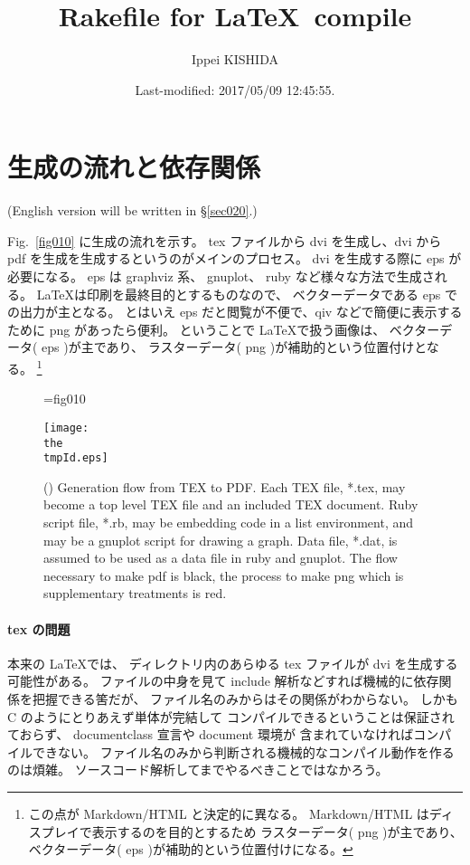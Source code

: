 \documentclass[a4paper,12pt]{jsarticle}
\title{Rakefile for \LaTeX ~compile}
\author{Ippei KISHIDA}
\date{Last-modified: 2017/05/09 12:45:55.}
\begin{document}
\maketitle
\tableofcontents


\section{生成の流れと依存関係}
\label{sec010}

(English version will be written in \S\ref{sec020}.)

Fig.~\ref{fig010} に生成の流れを示す。
tex ファイルから dvi を生成し、dvi から pdf を生成を生成するというのがメインのプロセス。
dvi を生成する際に eps が必要になる。
eps は graphviz 系、 gnuplot、 ruby など様々な方法で生成される。
\LaTeX は印刷を最終目的とするものなので、
ベクターデータである eps での出力が主となる。
とはいえ eps だと閲覧が不便で、qiv などで簡便に表示するために png があったら便利。
ということで \LaTeX で扱う画像は、
ベクターデータ( eps )が主であり、
ラスターデータ( png )が補助的という位置付けとなる。
\footnote{
  この点が Markdown/HTML と決定的に異なる。
  Markdown/HTML はディスプレイで表示するのを目的とするため
  ラスターデータ( png )が主であり、
  ベクターデータ( eps )が補助的という位置付けになる。
}

\begin{figure}[!htbp]
  \tmpId={fig010}
  \begin{center}
    \texttt{[image: \\the\\tmpId.eps]} %
  \end{center}
  \caption{(\the\tmpId)
    \label{\the\tmpId}
    Generation flow from TEX to PDF.
    Each TEX file, *.tex, may become a top level TEX file and an included TEX document.
    Ruby script file, *.rb,
    may be embedding code in a list environment,
    and may be a gnuplot script for drawing a graph.
    Data file, *.dat, is assumed to be used as a data file in ruby and gnuplot.
    The flow necessary to make pdf is black, the process to make png which is supplementary treatments is red.
  }
\end{figure}

\paragraph{tex の問題}

本来の \LaTeX では、
ディレクトリ内のあらゆる tex ファイルが dvi を生成する可能性がある。
ファイルの中身を見て include 解析などすれば機械的に依存関係を把握できる筈だが、
ファイル名のみからはその関係がわからない。
しかも C のようにとりあえず単体が完結して
コンパイルできるということは保証されておらず、
documentclass 宣言や document 環境が
含まれていなければコンパイルできない。
ファイル名のみから判断される機械的なコンパイル動作を作るのは煩雑。
ソースコード解析してまでやるべきことではなかろう。
\end{document}
